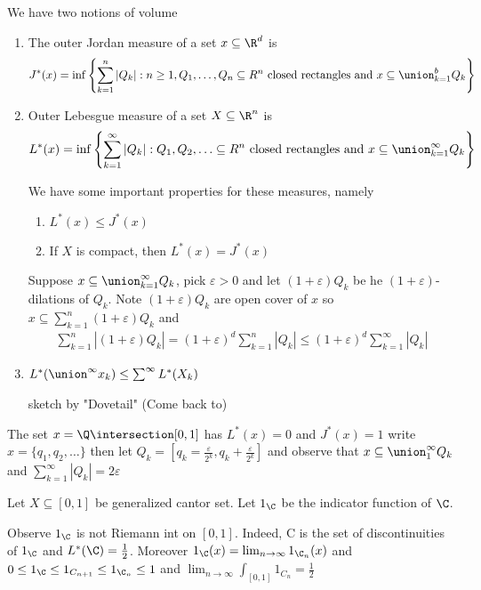We have two notions of volume
\begin{enumerate}
	\item The outer Jordan measure of a set $x \subseteq \R^d$ is
		\begin{align*}
			J^* (x)
      = \inf \left\{ \sum_{k=1}^{n} |Q_k| : n \geq 1, Q_1, \ldots, Q_n \subseteq R^n
      \text{ closed rectangles and }
			x \subseteq \union_{k=1}^{b} Q_k \right\}
		\end{align*}
	\item Outer Lebesgue measure of a set $X \subseteq \R^n$ is
		\begin{align*}
			L^*(x) = \inf \left\{ \sum_{k=1}^{\infty}|Q_k| : Q_1, Q_2, \ldots \subseteq R^n  \text{ closed rectangles and }
			x \subseteq \union_{k=1}^{\infty} Q_k \right\}
		\end{align*}

		We have some important properties for these measures, namely

		\begin{enumerate}
			\item $L^*(x) \leq J^* (x)$
			\item If  $X$ is compact, then $L^*(x) = J^*(x)$
		\end{enumerate}
		\begin{solution}
			Suppose $x \subseteq \union_{k=1}^{\infty} Q_k$, pick $\varepsilon > 0$ and let  $(1 + \varepsilon)Q_k$ be he $(1 + \varepsilon)$-dilations of $Q_k$. Note $(1+ \varepsilon ) Q_k$ are open cover of  $x$ so $x \subseteq \sum_{k=1}^n (1+\varepsilon) Q_k$ and
			\begin{align*}
				\sum_{k=1}^{n} |(1 + \varepsilon) Q_k| = (1+\varepsilon)^d \sum_{k=1}^{n}|Q_k| \leq (1 + \varepsilon)^d \sum_{k=1}^{\infty} | Q_k|
			\end{align*}
		\end{solution}

	\item $L^* (\union^{\infty} x_k ) \leq \sum_{}^{\infty} L^* (X_{k})$

		\begin{solution}
			sketch by "Dovetail" (Come back to)
		\end{solution}
\end{enumerate}

\begin{example}
	The set $x = \Q \intersection [0,1]$ has  $L^*(x) = 0$ and  $J^*(x) = 1$ write  $x = \{q_1, q_2, \ldots \}$ then let $Q_k = [q_k =  \frac{\varepsilon}{2^k}, q_k + \frac{\varepsilon}{2^k}]$
	and observe that $x \subseteq \union_{1}^{\infty} Q_k$ and $\sum_{k=1}^{\infty} |Q_k| = 2 \varepsilon$
\end{example}

\begin{example}
	Let $X \subseteq [0,1]$ be generalized cantor set. Let $1_{\C}$ be the indicator function of $\C$.

	Observe $1_ {\C}$ is not Riemann int on $[0,1]$. Indeed, C is the set of discontinuities of $1_{\C}$ and $L^*(\C) = \frac{1}{2}$. Moreover $1_{\C}(x) = \lim_{n\to \infty} 1_{\C_n} (x)$ and
	$0 \leq 1_{\C} \leq 1_{C_{n+1}} \leq 1_{\C_{n}} \leq 1$ and
	$\lim_{n \to \infty} \int_{[0,1]} 1_{C_{n}} = \frac{1}{2} $
\end{example}

